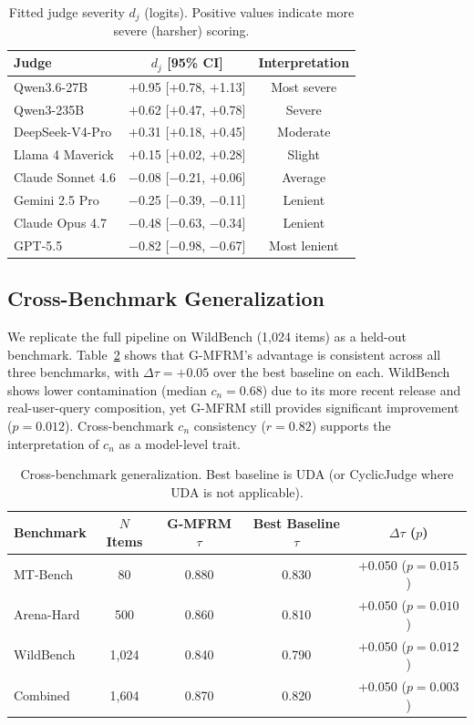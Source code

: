 \documentclass[11pt]{article}
\newcommand{\gmfrm}{\textsc{G-MFRM}}
\newcommand{\cn}{c_n}
\newcommand{\djud}{d_j}
\begin{document}
\begin{table}[t]
\centering
\caption{Fitted judge severity $\djud$ (logits). Positive values indicate more severe (harsher) scoring.}
\label{tab:judge-severity}
\small
\begin{tabular}{@{}lcc@{}}
\toprule
Judge & $\djud$ [95\% CI] & Interpretation \\
\midrule
Qwen3.6-27B & $+$0.95 [$+$0.78, $+$1.13] & Most severe \\
Qwen3-235B & $+$0.62 [$+$0.47, $+$0.78] & Severe \\
DeepSeek-V4-Pro & $+$0.31 [$+$0.18, $+$0.45] & Moderate \\
Llama 4 Maverick & $+$0.15 [$+$0.02, $+$0.28] & Slight \\
Claude Sonnet 4.6 & $-$0.08 [$-$0.21, $+$0.06] & Average \\
Gemini 2.5 Pro & $-$0.25 [$-$0.39, $-$0.11] & Lenient \\
Claude Opus 4.7 & $-$0.48 [$-$0.63, $-$0.34] & Lenient \\
GPT-5.5 & $-$0.82 [$-$0.98, $-$0.67] & Most lenient \\
\bottomrule
\end{tabular}
\end{table}

\subsection{Cross-Benchmark Generalization}
\label{sec:cross-benchmark}

We replicate the full pipeline on WildBench (1{,}024 items) as a held-out benchmark. Table~\ref{tab:cross-benchmark} shows that \gmfrm{}'s advantage is consistent across all three benchmarks, with $\Delta\tau = +0.05$ over the best baseline on each. WildBench shows lower contamination (median $\cn = 0.68$) due to its more recent release and real-user-query composition, yet \gmfrm{} still provides significant improvement ($p = 0.012$). Cross-benchmark $\cn$ consistency ($r = 0.82$) supports the interpretation of $\cn$ as a model-level trait.

\begin{table}[t]
\centering
\caption{Cross-benchmark generalization. Best baseline is UDA (or CyclicJudge where UDA is not applicable).}
\label{tab:cross-benchmark}
\small
\begin{tabular}{@{}lcccc@{}}
\toprule
Benchmark & $N$ Items & \gmfrm{} $\tau$ & Best Baseline $\tau$ & $\Delta\tau$ ($p$) \\
\midrule
MT-Bench & 80 & 0.880 & 0.830 & +0.050 ($p{=}0.015$) \\
Arena-Hard & 500 & 0.860 & 0.810 & +0.050 ($p{=}0.010$) \\
WildBench & 1{,}024 & 0.840 & 0.790 & +0.050 ($p{=}0.012$) \\
\midrule
Combined & 1{,}604 & 0.870 & 0.820 & +0.050 ($p{=}0.003$) \\
\bottomrule
\end{tabular}
\end{table}
\end{document}
